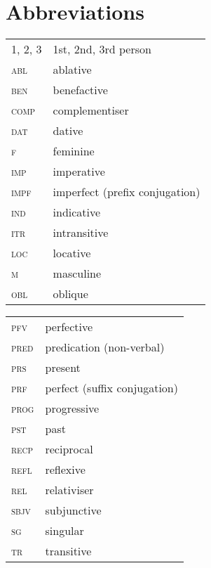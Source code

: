 \documentclass[output=paper]{langsci/langscibook}
\begin{document}
\section*{Abbreviations}

\begin{tabularx}{.5\textwidth}{@{}lQ@{}}
\textsc{1, 2, 3} & 1st, 2nd, 3rd person \\
\textsc{abl} & ablative \\
\textsc{ben} & benefactive \\
\textsc{comp} & complementiser \\
\textsc{dat} & dative \\
\textsc{f} & feminine \\
\textsc{imp} & imperative \\
\textsc{impf} & imperfect (prefix conjugation) \\
\textsc{ind} & indicative \\
\textsc{itr} & intransitive \\
\textsc{loc} & locative \\
\textsc{m} & masculine \\
\textsc{obl} & oblique \\
\end{tabularx}%
\begin{tabularx}{.5\textwidth}{@{}lQ@{}}
\textsc{pfv} & perfective \\
\textsc{pred} & predication (non-verbal) \\
\textsc{prs} & present \\
\textsc{prf} & perfect (suffix conjugation) \\
\textsc{prog} & progressive \\
\textsc{pst} & past \\
\textsc{recp} & reciprocal \\
\textsc{refl} & reflexive \\
\textsc{rel} & relativiser \\
\textsc{sbjv} & subjunctive \\
\textsc{sg} & singular \\
\textsc{tr} & transitive \\
\end{tabularx}%

\sloppy
\printbibliography[heading=subbibliography,notkeyword=this] 
\end{document}
